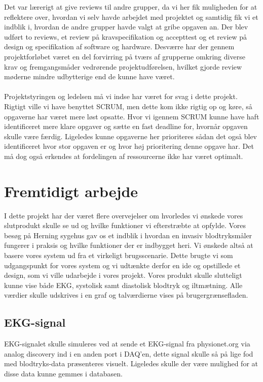 Det var lærerigt at give reviews til andre grupper, da vi her fik muligheden for at reflektere over, hvordan vi selv havde arbejdet med projektet og samtidig fik vi et indblik i, hvordan de andre grupper havde valgt at gribe opgaven an. Der blev udført to reviews, et review på kravspecifikation og accepttest og et review på design og specifikation af software og hardware.  Desværre har der gennem projektforløbet været en del forvirring på tværs af grupperne omkring diverse krav og fremgangsmåder vedrørende projektudførelsen, hvilket gjorde review møderne mindre udbytterige end de kunne have været.\\\\
Projektstyringen og ledelsen må vi indse har været for svag i dette projekt. Rigtigt ville vi have benyttet SCRUM, men dette kom ikke rigtig op og køre, så opgaverne har været mere løst opsatte. Hvor vi igennem SCRUM kunne have haft identificeret mere klare opgaver og sætte en fast deadline for, hvornår opgaven skulle være færdig. Ligeledes kunne opgaverne her prioriteres sådan det også blev identificeret hvor stor opgaven er og hvor høj prioritering denne opgave har. Det må dog også erkendes at fordelingen af ressourcerne ikke har været optimalt. 
\section{Fremtidigt arbejde}
I dette projekt har der været flere overvejelser om hvorledes vi ønskede vores slutprodukt skulle se ud og hvilke funktioner vi efterstræbte at opfylde. Vores besøg på Herning sygehus gav os et indblik i hvordan en invasiv blodtryksmåler fungerer i praksis og hvilke funktioner der er indbygget heri. Vi ønskede altså at basere vores system ud fra et virkeligt brugsscenarie. Dette brugte vi som udgangspunkt for vores system og vi udtænkte derfor en ide og opstillede et design, som vi ville udarbejde i vores projekt. Vores produkt skulle slutteligt kunne vise både EKG, systolisk samt diastolisk blodtryk og iltmætning. Alle værdier skulle udskrives i en graf og talværdierne vises på brugergrænsefladen. 
\subsection{EKG-signal}
EKG-signalet skulle  simuleres ved at sende et EKG-signal fra physionet.org via analog discovery ind i en anden port i DAQ’en, dette signal skulle så på lige fod med blodtryks-data præsenteres visuelt. Ligeledes skulle der være mulighed for at disse data kunne gemmes i databasen.
